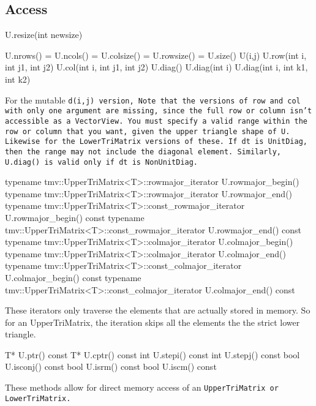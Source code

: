 \subsection{Access}
\label{TriMatrix_Access}

\begin{tmvcode}
U.resize(int newsize)
\end{tmvcode}

\begin{tmvcode}
U.nrows() = U.ncols() = U.colsize() = U.rowsize() = U.size()
U(i,j)
U.row(int i, int j1, int j2)
U.col(int i, int j1, int j2)
U.diag()
U.diag(int i)
U.diag(int i, int k1, int k2)
\end{tmvcode}
For the mutable \tt{d(i,j)} version, 
Note that the versions of \tt{row} and \tt{col} with only one argument are
missing, since the full row or column isn't accessible as a \tt{VectorView}.
You must specify a valid range within the row or column that you want, 
given the upper triangle shape of \tt{U}.  Likewise for the \tt{LowerTriMatrix}
versions of these.
If \tt{dt} is \tt{UnitDiag}, then the range may not include the diagonal element.
Similarly, \tt{U.diag()} is valid only if \tt{dt} is \tt{NonUnitDiag}.

\begin{tmvcode}
typename tmv::UpperTriMatrix<T>::rowmajor_iterator U.rowmajor_begin()
typename tmv::UpperTriMatrix<T>::rowmajor_iterator U.rowmajor_end()
typename tmv::UpperTriMatrix<T>::const_rowmajor_iterator U.rowmajor_begin() const
typename tmv::UpperTriMatrix<T>::const_rowmajor_iterator U.rowmajor_end() const
typename tmv::UpperTriMatrix<T>::colmajor_iterator U.colmajor_begin()
typename tmv::UpperTriMatrix<T>::colmajor_iterator U.colmajor_end()
typename tmv::UpperTriMatrix<T>::const_colmajor_iterator U.colmajor_begin() const
typename tmv::UpperTriMatrix<T>::const_colmajor_iterator U.colmajor_end() const
\end{tmvcode}
These iterators only traverse the elements that are actually stored in memory. So for an UpperTriMatrix, the iteration skips all the elements the the strict lower triangle.

\begin{tmvcode}
T* U.ptr()
const T* U.cptr() const
int U.stepi() const
int U.stepj() const
bool U.isconj() const
bool U.isrm() const
bool U.iscm() const
\end{tmvcode}
These methods allow for direct memory access of an \tt{UpperTriMatrix} or \tt{LowerTriMatrix}.

